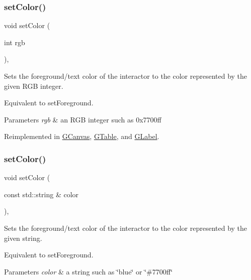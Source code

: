 \subsubsection{\texorpdfstring{set\+Color()}{setColor()}\hspace{0.1cm}{\footnotesize\ttfamily [1/2]}}
{\footnotesize\ttfamily void set\+Color (\begin{DoxyParamCaption}\item[{int}]{rgb }\end{DoxyParamCaption})\hspace{0.3cm}{\ttfamily [virtual]}, {\ttfamily [inherited]}}



Sets the foreground/text color of the interactor to the color represented by the given R\+GB integer. 

Equivalent to set\+Foreground. 
\begin{DoxyParams}{Parameters}
{\em rgb} & an R\+GB integer such as 0x7700ff \\
\hline
\end{DoxyParams}


Reimplemented in \mbox{\hyperlink{classGCanvas_af6e1bcf23a09a0ae0607daff81ee45fa}{G\+Canvas}}, \mbox{\hyperlink{classGTable_a165735fb49fa7db12602d32557cbfe0d}{G\+Table}}, and \mbox{\hyperlink{classGLabel_a165735fb49fa7db12602d32557cbfe0d}{G\+Label}}.

\mbox{\label{classGInteractor_a61374df6c11b52cfbb0815decdbaebc6}} 
\subsubsection{\texorpdfstring{set\+Color()}{setColor()}\hspace{0.1cm}{\footnotesize\ttfamily [2/2]}}
{\footnotesize\ttfamily void set\+Color (\begin{DoxyParamCaption}\item[{const std\+::string \&}]{color }\end{DoxyParamCaption})\hspace{0.3cm}{\ttfamily [virtual]}, {\ttfamily [inherited]}}



Sets the foreground/text color of the interactor to the color represented by the given string. 

Equivalent to set\+Foreground. 
\begin{DoxyParams}{Parameters}
{\em color} & a string such as \char`\"{}blue\char`\"{} or \char`\"{}\#7700ff\char`\"{} \\
\hline
\end{DoxyParams}


